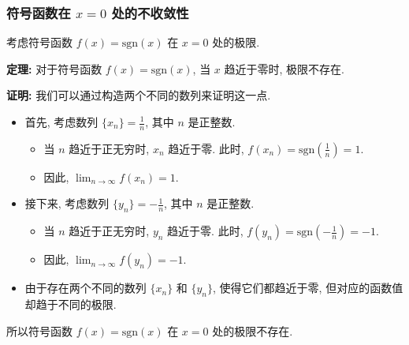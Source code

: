 \documentclass[
10pt, 
aspectratio=43, 
]{beamer}
\begin{document}
\begin{frame}
\frametitle{符号函数在 $x=0$ 处的不收敛性}

考虑符号函数 $f(x) = \text{sgn}(x)$ 在 $x=0$ 处的极限. 

\pause

\textbf{定理: } 对于符号函数 $f(x) = \text{sgn}(x)$, 当 $x$ 趋近于零时, 极限不存在. 

\pause

\textbf{证明: } 
我们可以通过构造两个不同的数列来证明这一点. 

\pause
\begin{itemize}
\item 首先, 考虑数列 $\{x_n\} = \frac{1}{n}$, 其中 $n$ 是正整数. 

\pause
\begin{itemize}
\item 当 $n$ 趋近于正无穷时, $x_n$ 趋近于零. 此时, $f(x_n) = \text{sgn}\left(\frac{1}{n}\right) = 1$. 

\pause

\item 因此, $\lim_{n \to \infty} f(x_n) = 1$. 
\end{itemize}
\pause

\item 接下来, 考虑数列 $\{y_n\} = -\frac{1}{n}$, 其中 $n$ 是正整数. 
\begin{itemize}
\pause

\item 当 $n$ 趋近于正无穷时, $y_n$ 趋近于零. 此时, $f(y_n) = \text{sgn}\left(-\frac{1}{n}\right) = -1$. 

\pause

\item 因此, $\lim_{n \to \infty} f(y_n) = -1$. 

\end{itemize}

\pause

\item 由于存在两个不同的数列 $\{x_n\}$ 和 $\{y_n\}$, 使得它们都趋近于零, 但对应的函数值却趋于不同的极限.

\end{itemize}

\pause

所以符号函数 $f(x) = \text{sgn}(x)$ 在 $x=0$ 处的极限不存在. 

\end{frame}
\end{document}
